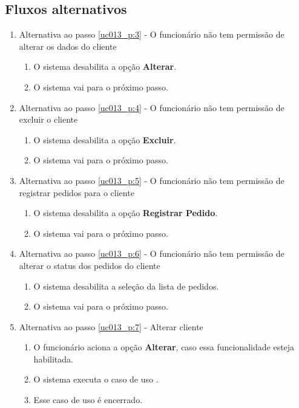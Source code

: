\subsection{Fluxos alternativos}

\begin{enumerate}[label=A\arabic*]
	\item Alternativa ao passo \ref{uc013_p:3} - O funcionário não tem permissão de alterar os dados do cliente \label{uc013_a:1}
	\begin{enumerate}[label*=.\arabic*]
		\item O sistema desabilita a opção \textbf{Alterar}.
		\item O sistema vai para o próximo passo.
	\end{enumerate}

	\item Alternativa ao passo \ref{uc013_p:4} - O funcionário não tem permissão de excluir o cliente \label{uc013_a:2}
	\begin{enumerate}[label*=.\arabic*]
		\item O sistema desabilita a opção \textbf{Excluir}.
		\item O sistema vai para o próximo passo.
	\end{enumerate}

	\item Alternativa ao passo \ref{uc013_p:5} - O funcionário não tem permissão de registrar pedidos para o cliente \label{uc013_a:3}
	\begin{enumerate}[label*=.\arabic*]
		\item O sistema desabilita a opção \textbf{Registrar Pedido}.
		\item O sistema vai para o próximo passo.
	\end{enumerate}
	
	\item Alternativa ao passo \ref{uc013_p:6} - O funcionário não tem permissão de alterar o status dos pedidos do cliente \label{uc013_a:4}
	\begin{enumerate}[label*=.\arabic*]
		\item O sistema desabilita a seleção da lista de pedidos.
		\item O sistema vai para o próximo passo.
	\end{enumerate}
	
	\item Alternativa ao passo \ref{uc013_p:7} - Alterar cliente \label{uc013_a:5}
	\begin{enumerate}[label*=.\arabic*]
		\item O funcionário aciona a opção \textbf{Alterar}, caso essa funcionalidade esteja habilitada.
		\item O sistema executa o caso de uso .
		\item Esse caso de uso é encerrado.
	\end{enumerate}


\end{enumerate}
